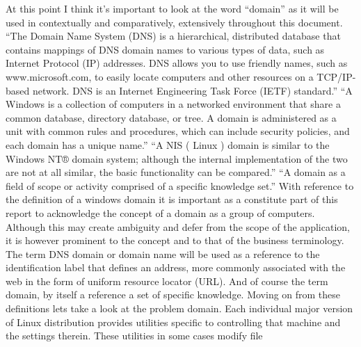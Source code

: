 \begin{multicols}{2}
			At this point I think it's important to look at the word ``domain'' as it will be used in contextually and comparatively, 
			extensively throughout this document.
			\newline
			\newline
			``The Domain Name System (DNS) is a hierarchical, distributed database that contains mappings of DNS domain names to various types 
			of data, such as Internet Protocol (IP) addresses. DNS allows you to use friendly names, such as www.microsoft.com, to easily 
			locate computers and other resources on a TCP/IP-based network. DNS is an Internet Engineering Task Force (IETF) standard.''
			\newline
			\newline
			``A Windows is a collection of computers in a networked environment that share a common database, directory database, or tree. 
			A domain is administered as a unit with common rules and procedures, which can include security policies, and each domain has 
			a unique name.''
			\newline
			\newline
			``A NIS ( Linux ) domain is similar to the Windows NT® domain system; although the internal implementation of the two are not 
			at all similar, the basic functionality can be compared.''
			\newline
			\newline
			``A domain as a field of scope or activity comprised of a specific knowledge set.'' 
			\newline
			\newline
			With reference to the definition of a windows domain it is important as a constitute part of this report to acknowledge the 
			concept of a domain as a group of computers.  Although this may create ambiguity and defer from the scope of the application, 
			it is however prominent to the concept and to that of the business terminology.  The term DNS domain or domain name will be 
			used as a reference to the identification label that defines an address, more commonly associated with the web in the form of 
			uniform resource locator (URL). And of course the term domain, by itself a reference a set of specific knowledge.
			\newline
			\newline
			Moving on from these definitions lets take a look at the problem domain.  Each individual major version of Linux distribution 
			provides utilities specific to controlling that machine and the settings therein.  These utilities in some cases modify file 

\end{multicols}
